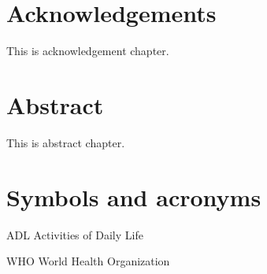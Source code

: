 \documentclass[oneside]{book}
\begin{document}
\coverpage
\tableofcontents
\cleardoublepage 

\chapter*{Acknowledgements}
This is acknowledgement chapter.

\chapter*{Abstract}
This is abstract chapter.

\listoffigures

\listoftables

\chapter*{Symbols and acronyms}
\begin{abbrv}
    \item[ADL]                   Activities of Daily Life
    \item[WHO]                   World Health Organization
\end{abbrv}



\end{document}
